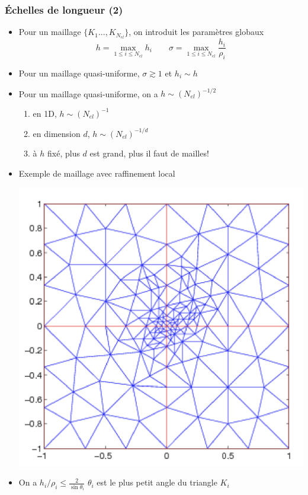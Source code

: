 \documentclass{beamer}
\begin{document}
\begin{frame}
\frametitle{Échelles de longueur (2)}
\begin{itemize}
\item Pour un maillage $\{K_1 . . .,K_{N_{el}}\}$, on introduit les paramètres globaux
\[h=\max_{1\leq i\leq N_{el}} h_i\qquad \sigma =\max_{1\leq i\leq N_{el}} \frac{h_i}{\rho_i}\]
\item Pour un maillage quasi-uniforme, $\sigma\gtrsim  1$ et $h_i \sim h$
\item Pour un maillage quasi-uniforme, on a $h \sim (N_{el})^ {-1/2}$
\begin{enumerate}
\item en 1D, $h \sim (N_{el})^{-1}$
\item en dimension $d$, $h \sim (N_{el})^{-1/d}$
\item à $h$ fixé, plus $d$ est grand, plus il faut de mailles!
\end{enumerate}
\item Exemple de maillage avec raffinement local

\begin{center}
\includegraphics[scale=0.22]{maillage03.png} 
\end{center}
\item On a $h_i/\rho_i \leq \frac{2}{\sin\theta_i}$ $\theta_i$ est le plus petit angle du triangle $K_i$
\end{itemize}
\end{frame}
\end{document}
